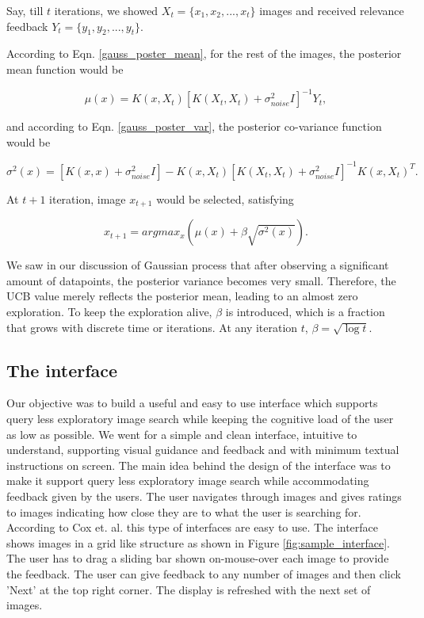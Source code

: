 \documentclass[english]{tktltiki}
\begin{document}
Say, till $t$ iterations, we showed $X_t = \{x_1, x_2, ..., x_t\}$ images and received relevance feedback $Y_t = \{y_1, y_2, ..., y_t\}$.

According to Eqn. \ref{gauss_poster_mean}, for the rest of the images, the posterior mean function would be

\begin{equation}
\mu(x) = K(x, X_t)[K(X_t, X_t) + \sigma_{noise}^2I]^{-1}Y_t,
\end{equation}

and according to Eqn. \ref{gauss_poster_var}, the posterior co-variance function would be

\begin{equation}
\sigma^2(x) = [K(x, x) + \sigma_{noise}^2I] - K(x, X_t)[K(X_t, X_t) + \sigma_{noise}^2I]^{-1}K(x, X_t)^T.
\end{equation}

At $t+1$ iteration, image $x_{t+1}$ would be selected, satisfying

\begin{equation}
x_{t+1} = argmax_x(\mu(x) + \beta\sqrt{\sigma^2(x)}).
\end{equation}

We saw in our discussion of Gaussian process that after observing a significant amount of datapoints, the posterior variance becomes very small. Therefore, the UCB value merely reflects the posterior mean, leading to an almost zero exploration. To keep the exploration alive, $\beta$ is introduced, which is a fraction that grows with discrete time or iterations. At any iteration $t$, $\beta = \sqrt{\log t}$.

\subsection{The interface}

Our objective was to build a useful and easy to use interface which supports query less exploratory image search \cite{pichunter, PicSOM, iter_rel_feed} while keeping the cognitive load of the user as low as possible. We went for a simple and clean interface, intuitive to understand, supporting visual guidance and feedback and with minimum textual instructions on screen. The main idea behind the design of the interface was to make it support query less exploratory image search while accommodating feedback given by the users. The user navigates through images and gives ratings to images indicating how close they are to what the user is searching for. According to Cox et. al. \cite{pichunter} this type of interfaces are easy to use. The interface shows images in a grid like structure as shown in Figure \ref{fig:sample_interface}. The user has to drag a sliding bar shown on-mouse-over each image to provide the feedback. The user can give feedback to any number of images and then click 'Next' at the top right corner. The display is refreshed with the next set of images.
\end{document}
